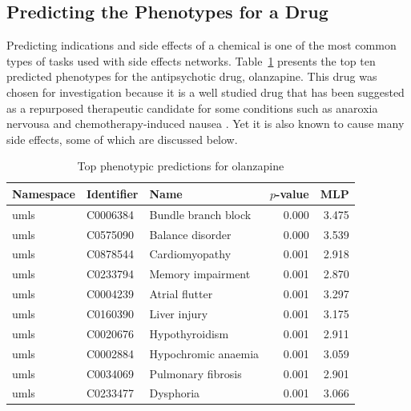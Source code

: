 \subsection{Predicting the Phenotypes for a Drug}

Predicting indications and side effects of a chemical is one of the most common types of tasks used with side effects networks.
Table~\ref{tab:drug_phenotype} presents the top ten predicted phenotypes for the antipsychotic drug, olanzapine. 
This drug was chosen for investigation because it is a well studied drug that has been suggested as a repurposed therapeutic candidate for some conditions such as anaroxia nervousa \cite{himmerich_olanzapine_2017} and chemotherapy-induced nausea \cite{flank_olanzapine_2018}. 
Yet it is also known to cause many side effects, some of which are discussed below.

\begin{table}[!ht]
    \centering
    \begin{tabular}{|l|l|l|r|r|}
        \hline
        \textbf{Namespace} & \textbf{Identifier} & \textbf{Name} & \textbf{$p$-value} & \textbf{MLP} \\
        \hline
        umls & C0006384 & Bundle branch block & 0.000 & 3.475 \\
        \hline
        umls & C0575090 & Balance disorder & 0.000 & 3.539 \\
        \hline
        umls & C0878544 & Cardiomyopathy & 0.001 & 2.918 \\
        \hline
        umls & C0233794 & Memory impairment & 0.001 & 2.870 \\
        \hline
        umls & C0004239 & Atrial flutter & 0.001 & 3.297 \\
        \hline
        umls & C0160390 & Liver injury & 0.001 & 3.175 \\
        \hline
        umls & C0020676 & Hypothyroidism & 0.001 & 2.911 \\
        \hline
        umls & C0002884 & Hypochromic anaemia & 0.001 & 3.059 \\
        \hline
        umls & C0034069 & Pulmonary fibrosis & 0.001 & 2.901 \\
        \hline
        umls & C0233477 & Dysphoria & 0.001 & 3.066 \\
        \hline
    \end{tabular}
    \caption{Top phenotypic predictions for olanzapine}
    \label{tab:drug_phenotype}
\end{table}

